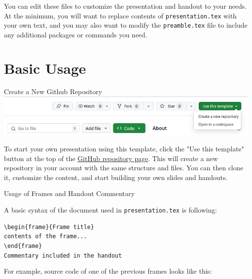 You can edit these files to customize the presentation and handout to your
needs. At the minimum, you will want to replace contents of
\texttt{presentation.tex} with your own text, and you may also want to modify
the \texttt{preamble.tex} file to include any additional packages or commands
you need.

\section{Basic Usage}

\begin{frame}[fragile]{Create a New Github Repository}
  \includegraphics[width=\textwidth]{img/template-use.png}
\end{frame}

To start your own presentation using this template, click the "Use this
template" button at the top of the \href{https://github.com/michal-h21/tex4ht-presentation}{GitHub repository page}. This will create a
new repository in your account with the same structure and files. You can then
clone it, customize the content, and start building your own slides and
handouts.


\begin{frame}[fragile]{Usage of Frames and Handout Commentary}

  \begin{block}{}
    A basic syntax of the document used in \verb|presentation.tex| is following:
  \end{block}

\begin{likeverbatim}  
  \verb|\begin{frame}{Frame title}|\\
  \verb|contents of the frame...|\\
  \verb|\end|\verb|{frame}|\\
  \vspace{1em}
  \verb|Commentary included in the handout|
\end{likeverbatim}

\end{frame}

For example, source code of one of the previous frames looks like this:

